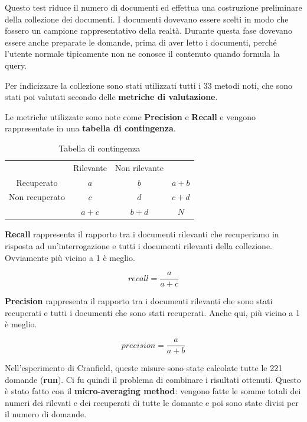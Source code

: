 Questo test riduce il numero di documenti ed effettua una costruzione preliminare della collezione dei documenti. I documenti dovevano essere scelti in modo che fossero un campione rappresentativo della realtà. Durante questa fase dovevano essere anche preparate le domande, prima di aver letto i documenti, perché l'utente normale tipicamente non ne conosce il contenuto quando formula la query.

Per indicizzare la collezione sono stati utilizzati tutti i 33 metodi noti, che sono stati poi valutati secondo delle \textbf{metriche di valutazione}.

Le metriche utilizzate sono note come \textbf{Precision} e \textbf{Recall} e vengono rappresentate in una \textbf{tabella di contingenza}.

\begin{table}[htbp]
	\centering	
	\begin{tabular}{cccc}
		\cline{2-3}
		\multicolumn{1}{c|}{}                & \multicolumn{1}{c|}{Rilevante} & \multicolumn{1}{c|}{Non rilevante} &     \\ \cline{1-3}
		\multicolumn{1}{|c|}{Recuperato}     & \multicolumn{1}{c|}{$a$}         & \multicolumn{1}{c|}{$b$}             & $a+b$ \\ \cline{1-3}
		\multicolumn{1}{|c|}{Non recuperato} & \multicolumn{1}{c|}{$c$}         & \multicolumn{1}{c|}{$d$}             & $c+d$ \\ \cline{1-3}
		& $a+c$                            & $b+d$                                & $N$  
	\end{tabular}
	\caption{Tabella di contingenza}
\end{table}

\noindent \textbf{Recall} rappresenta il rapporto tra i documenti rilevanti che recuperiamo in risposta ad un'interrogazione e tutti i documenti rilevanti della collezione. Ovviamente più vicino a 1 è meglio.

$$
recall = \frac{a}{a+c}
$$

\noindent \textbf{Precision} rappresenta il rapporto tra i documenti rilevanti che sono stati recuperati e tutti i documenti che sono stati recuperati. Anche qui, più vicino a 1 è meglio.

$$
precision = \frac{a}{a+b}
$$

Nell'esperimento di Cranfield, queste misure sono state calcolate tutte le 221 domande (\textbf{run}).
Ci fu quindi il problema di combinare i risultati ottenuti. Questo è stato fatto con il \textbf{micro-averaging method}: vengono fatte le somme totali dei numeri dei rilevati e dei recuperati di tutte le domante e poi sono state divisi per il numero di domande.

